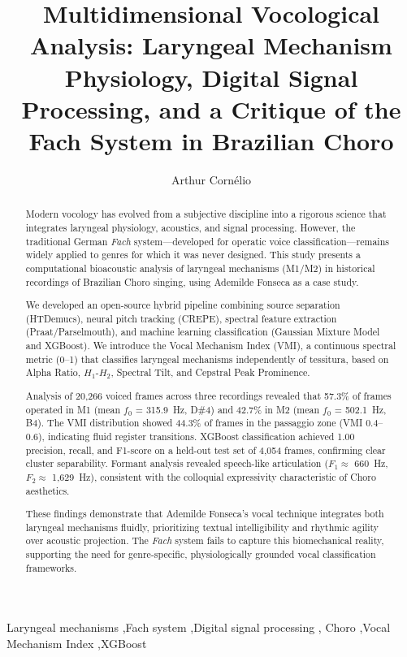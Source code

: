 \documentclass[review,3p,number]{elsarticle}
\begin{document}
\begin{frontmatter}

\title{Multidimensional Vocological Analysis: Laryngeal Mechanism Physiology, Digital Signal Processing, and a Critique of the Fach System in Brazilian Choro}

\author[ind]{Arthur Cornélio}


\begin{abstract}
Modern vocology has evolved from a subjective discipline into a rigorous science
that integrates laryngeal physiology, acoustics, and signal processing. However,
the traditional German \emph{Fach} system---developed for operatic voice
classification---remains widely applied to genres for which it was never designed.
This study presents a computational bioacoustic analysis of laryngeal mechanisms
(M1/M2) in historical recordings of Brazilian Choro singing, using Ademilde Fonseca
as a case study.

We developed an open-source hybrid pipeline combining source separation (HTDemucs),
neural pitch tracking (CREPE), spectral feature extraction (Praat/Parselmouth), and
machine learning classification (Gaussian Mixture Model and XGBoost). We introduce
the Vocal Mechanism Index (VMI), a continuous spectral metric (0--1) that classifies
laryngeal mechanisms independently of tessitura, based on Alpha Ratio, $H_1$-$H_2$,
Spectral Tilt, and Cepstral Peak Prominence.

Analysis of 20,266 voiced frames across three recordings revealed that 57.3\% of
frames operated in M1 (mean $f_0$ = 315.9~Hz, D\#4) and 42.7\% in M2 (mean $f_0$ =
502.1~Hz, B4). The VMI distribution showed 44.3\% of frames in the passaggio zone
(VMI 0.4--0.6), indicating fluid register transitions. XGBoost classification
achieved 1.00 precision, recall, and F1-score on a held-out test set of 4,054
frames, confirming clear cluster separability. Formant analysis revealed speech-like
articulation ($F_1 \approx$ 660~Hz, $F_2 \approx$ 1,629~Hz), consistent with the
colloquial expressivity characteristic of Choro aesthetics.

These findings demonstrate that Ademilde Fonseca's vocal technique integrates both
laryngeal mechanisms fluidly, prioritizing textual intelligibility and rhythmic
agility over acoustic projection. The \emph{Fach} system fails to capture this
biomechanical reality, supporting the need for genre-specific, physiologically
grounded vocal classification frameworks.
\end{abstract}

\begin{keyword}
Laryngeal mechanisms \sep Fach system \sep Digital signal processing \sep
Choro \sep Vocal Mechanism Index \sep XGBoost
\end{keyword}

\end{frontmatter}
\end{document}
